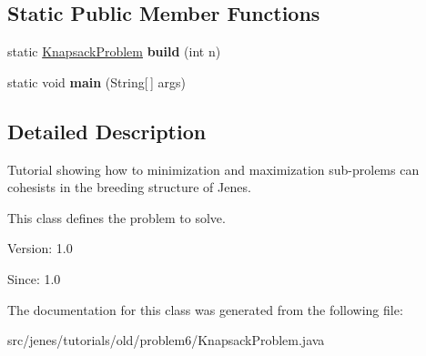 \subsection*{Static Public Member Functions}
\begin{CompactItemize}
\item 
\hypertarget{classjenes_1_1tutorials_1_1old_1_1problem6_1_1_knapsack_problem_8e9ae71984885743ff2892d4bff2727e}{
static \hyperlink{classjenes_1_1tutorials_1_1old_1_1problem6_1_1_knapsack_problem}{KnapsackProblem} \textbf{build} (int n)}
\label{classjenes_1_1tutorials_1_1old_1_1problem6_1_1_knapsack_problem_8e9ae71984885743ff2892d4bff2727e}

\item 
\hypertarget{classjenes_1_1tutorials_1_1old_1_1problem6_1_1_knapsack_problem_135fb0906a4034fcd7be21c23f794953}{
static void \textbf{main} (String\mbox{[}$\,$\mbox{]} args)}
\label{classjenes_1_1tutorials_1_1old_1_1problem6_1_1_knapsack_problem_135fb0906a4034fcd7be21c23f794953}

\end{CompactItemize}


\subsection{Detailed Description}
Tutorial showing how to minimization and maximization sub-prolems can cohesists in the breeding structure of Jenes.

This class defines the problem to solve.

\begin{Desc}
\item[Version:]1.0 \end{Desc}
\begin{Desc}
\item[Since:]1.0 \end{Desc}


The documentation for this class was generated from the following file:\begin{CompactItemize}
\item 
src/jenes/tutorials/old/problem6/KnapsackProblem.java\end{CompactItemize}
